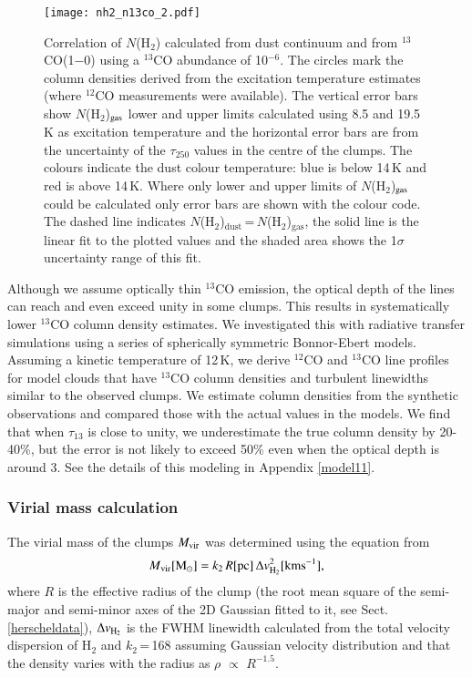 \documentclass[printer]{aa}
\begin{document}
\begin{figure}[t]
	\centering
		\texttt{[image: nh2\_n13co\_2.pdf]}
	\caption{Correlation of $N$(H$_2$) calculated from dust continuum and from $^{13}$CO(1$-$0) using a $^{13}$CO abundance of 10$^{-6}$. The circles mark the column densities derived from the excitation temperature estimates (where $^{12}$CO measurements were available). The vertical error bars show $N$(H$_2$)$_{\rm gas}$ lower and upper limits calculated using 8.5 and 19.5\,K as excitation temperature and the horizontal error bars are from the uncertainty of the $\tau_{250}$ values in the centre of the clumps. The colours indicate the dust colour temperature: blue is below 14\,K and red is above 14\,K. Where only lower and upper limits of $N$(H$_2$)$_{\rm gas}$ could be calculated only error bars are shown with the colour code. The dashed line indicates $N$(H$_2$)$\mathrm{_{dust}}$\,=\,$N$(H$_2$)$\mathrm{_{gas}}$, the solid line is the linear fit to the plotted values and the shaded area shows the 1$\sigma$uncertainty range of this fit.}
	\label{NvsN}
\end{figure}

Although we assume optically thin $^{13}$CO emission, the optical depth of the lines can reach and even exceed unity in some clumps. This results in systematically lower $^{13}$CO column density estimates. We investigated this with radiative transfer simulations using a series of spherically symmetric Bonnor-Ebert models. Assuming a kinetic temperature of 12\,K, we derive $^{12}$CO and $^{13}$CO line profiles for model clouds that have $^{13}$CO column densities and turbulent linewidths similar to the observed clumps. We estimate column densities from the synthetic observations and compared those with the actual values in the models. We find that when $\tau_{13}$ is close to unity, we underestimate the true column density by 20-40\%, but the error is not likely to exceed 50\% even when the optical depth is around 3. See the details of this modeling in Appendix \ref{model11}.

\subsubsection{Virial mass calculation}

The virial mass of the clumps $M_{\rm vir}$ was determined using the equation from \citet{maclaren1988}
\begin{equation}
M\mathrm{_{vir}} [\mathrm{M_{\odot}}]=k_2\,R [\mathrm{pc}]\,\Delta v_{\rm H_2}^2 [\mathrm{kms^{-1}}],
\end{equation}
where $R$ is the effective radius of the clump (the root mean square of the semi-major and semi-minor axes of the 2D Gaussian fitted to it, see Sect. \ref{herscheldata}), $\Delta v_{\rm H_2}$ is the FWHM linewidth calculated from the total velocity dispersion of H$_2$ and $k_2$\,=\,168 assuming Gaussian velocity distribution and that the density varies with the radius as $\rho$ $\propto$ $R^{-1.5}$. 
\end{document}
